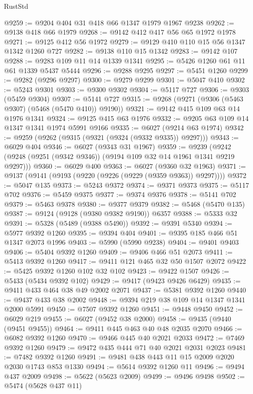 \begin{lexlean}{RustStd}
\begin{coremodule}
@9259 := @9204 @404 @31 @418 @66 @1347 @1979 @1967 @9238
@9262 := @9138 @418 @66 @1979
@9268 := @9142 @412 @417 @56 @65 @1972 @1978
@9271 := @9125 @412 @56 @1972
@9279 := @9129 @410 @110 @15 @56 @1347 @1342 @1260 @727
@9282 := @9138 @110 @15 @1342
@9283 := @9142 @107
@9288 := @9283 @109 @11 @14 @1339 @1341
@9295 := @5426 @1260 @61 @11 @61 @1339 @5437 @5444
@9296 := @9288 @9295
@9297 := @5451 @1260
@9299 := @9282 (@9296 @9297)
@9300 := @9279 @9299
@9301 := @5047 @410
@9302 := @5243 @9301
@9303 := @9300 @9302
@9304 := @5117 @727
@9306 := @9303 (@5459 @9304)
@9307 := @5141 @727
@9315 := @9268 (@9271 (@9306 (@5463 @9307) (@5468 (@5470 @410)) @9190))
@9321 := @9142 @415 @109 @63 @14 @1976 @1341
@9324 := @9125 @415 @63 @1976
@9332 := @9205 @63 @109 @14 @1347 @1341 @1974 @5991 @9166
@9335 := @6027 (@9214 @63 @1974)
@9342 := @9259 (@9262 (@9315 (@9321 (@9324 (@9332 @9335)) @9297)))
@9343 := @6029 @404
@9346 := @6027 (@9343 @31 @1967)
@9359 := @9239 (@9242 (@9248 (@9251 (@9342 @9346)) (@9194 @109 @32 @14 @1961 @1341 @9219 @9297)))
@9360 := @6029 @400
@9363 := @6027 (@9360 @32 @1963)
@9371 := @9137 (@9141 (@9193 (@9220 (@9226 (@9229 (@9359 @9363)) @9297))))
@9372 := @5047 @135
@9373 := @5243 @9372
@9374 := @9371 @9373
@9375 := @5117 @702
@9376 := @5459 @9375
@9377 := @9374 @9376
@9378 := @5141 @702
@9379 := @5463 @9378
@9380 := @9377 @9379
@9382 := @5468 (@5470 @135)
@9387 := @9124 (@9128 (@9380 @9382 @9190)) @6357
@9388 := @5333 @32
@9391 := @5328 (@5489 (@9388 @5490))
@9392 := @9391 @5340
@9394 := @5977 @9392 @1260
@9395 := @9394 @404
@9401 := @9395 @185 @466 @51 @1347 @2073 @1996
@9403 := @5990 (@5990 @9238)
@9404 := @9401 @9403
@9406 := @5404 @9392 @1260
@9409 := @9406 @466 @51 @2073
@9411 := @5413 @9392 @1260
@9417 := @9411 @121 @465 @32 @50 @1507 @2072
@9422 := @5425 @9392 @1260 @102 @32 @102
@9423 := @9422 @1507
@9426 := @5433 (@5434 @9392 @102)
@9429 := @9417 (@9423 @9426 @6429)
@9435 := @9411 @433 @464 @38 @49 @2002 @2071
@9437 := @5381 @9392 @1260
@9440 := @9437 @433 @38 @2002
@9448 := @9394 @219 @38 @109 @14 @1347 @1341 @2000 @5991
@9450 := @7507 @9392 @1260
@9451 := @9448 @9450
@9452 := @6029 @219
@9455 := @6027 (@9452 @38 @2000)
@9458 := @9435 (@9440 (@9451 @9455))
@9464 := @9411 @445 @463 @40 @48 @2035 @2070
@9466 := @6082 @9392 @1260
@9470 := @9466 @445 @40 @2021 @2033
@9472 := @7469 @9392 @1260
@9479 := @9472 @435 @444 @71 @40 @2021 @2031 @2023
@9481 := @7482 @9392 @1260
@9491 := @9481 @438 @443 @11 @15 @2009 @2020 @2030 @1743 @853 @1330
@9494 := @5614 @9392 @1260 @11
@9496 := @9494 @437 @2009
@9498 := @5622 (@5623 @2009)
@9499 := @9496 @9498
@9502 := @5474 (@5628 @437 @11)

\end{coremodule}
\end{lexlean}

